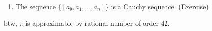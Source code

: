 \begin{enumerate}
\begin{proof}
\begin{align*}
&=\left|\frac{a_{n+1}'p_n + p_{n-1}}{a_{n+1}'q_n+q_{n-1}}-\frac{p_n}{q_n}\right|
=\left|
\frac{p_{n-1}q_n - p_nq_{n-1}}{q_n(a_{n+1}'q_n+q_{n-1})}\right|\\
&=\left|\frac{(-1)^{n}
p_1q_0-p_0q_1}{q_n(a_{n+1}'q_n+q_{n-1})}\right|
=\frac{1}{q_n(a_{n+1}'q_n+q_{n-1})}\\
&<\frac{1}{q_nq_{n+1}}
\end{align*}
\end{proof}
\begin{corollary}
Furthermore, for the convergent term $\frac{p_n}{q_n} (n\ge0)$ of $x$, we have
\[
\left|
x-\frac{p_n}{q_n}
\right|<\frac{1}{q_{n}^2}
\]
\end{corollary}
\item
The sequence $\{[a_0,a_1,\dots,a_n]\}$ is a Cauchy sequence. (Exercise)
\end{enumerate}
btw, $\pi$ is approximable by rational number of order 42.




